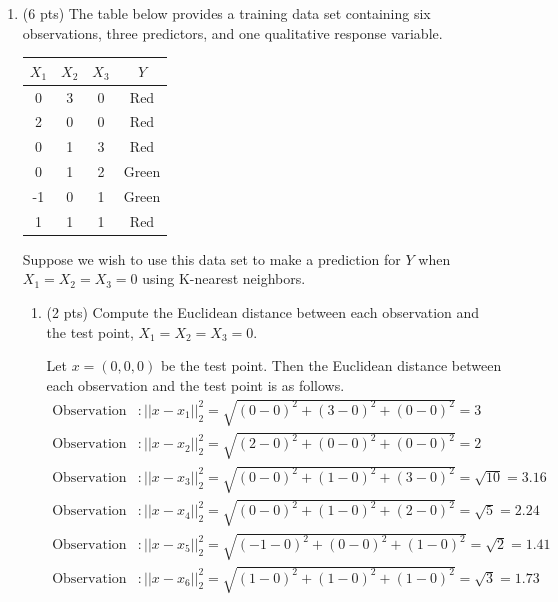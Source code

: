 \documentclass[a4paper]{article}
\theoremstyle{definition}
\newenvironment{soln}{
    \leavevmode\color{blue}\ignorespaces
}{}
\begin{document}
\begin{enumerate}
\begin{enumerate}
\end{enumerate}

\item (6 pts) The table below provides a training data set containing six observations, three predictors, and one qualitative response variable.

\begin{center}
	\begin{tabular}{ c  c  c  c}
		\hline
		$X_{1}$ & $X_{2}$ & $X_{3}$ & $Y$ \\ \hline
		0 & 3 & 0 & Red \\
		2 & 0 & 0 & Red \\
		0 & 1 & 3 & Red \\
		0 & 1 & 2 & Green \\
		-1 & 0 & 1 & Green \\
		1 & 1 & 1 & Red  \\
		\hline
	\end{tabular}
\end{center}

Suppose we wish to use this data set to make a prediction for $Y$ when $X_{1} = X_{2} = X_{3} = 0$ using K-nearest neighbors.

\begin{enumerate}
	\item (2 pts) Compute the Euclidean distance between each observation and the test point, $X_{1} = X_{2} = X_{3}=0$.
 
	\begin{soln} 
		Let $x = (0, 0, 0)$ be the test point. Then the Euclidean distance between each observation and the test point is as follows.
		\begin{align*}
			\text{Observation 1} & : ||x - x_1||_2^2 = \sqrt{(0-0)^2 + (3-0)^2 + (0-0)^2} = 3 \\
			\text{Observation 2} & : ||x - x_2||_2^2 =\sqrt{(2-0)^2 + (0-0)^2 + (0-0)^2} = 2 \\
			\text{Observation 3} & : ||x - x_3||_2^2 =\sqrt{(0-0)^2 + (1-0)^2 + (3-0)^2} = \sqrt{10} = 3.16\\
			\text{Observation 4} & : ||x - x_4||_2^2 =\sqrt{(0-0)^2 + (1-0)^2 + (2-0)^2} = \sqrt{5} = 2.24\\
			\text{Observation 5} & : ||x - x_5||_2^2 =\sqrt{(-1-0)^2 + (0-0)^2 + (1-0)^2} = \sqrt{2} = 1.41\\
			\text{Observation 6} & : ||x - x_6||_2^2 =\sqrt{(1-0)^2 + (1-0)^2 + (1-0)^2} = \sqrt{3} = 1.73\\
		\end{align*}
	\end{soln}
 

\end{enumerate}
\end{enumerate}
\end{document}
